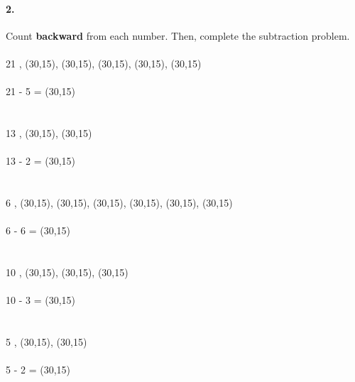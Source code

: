 \documentclass[12pt]{article}
\begin{document}
\paragraph{2.}
Count \textbf{backward} from each number. Then, complete the subtraction problem. \\
\\
21 , \framebox(30,15){}, \framebox(30,15){}, \framebox(30,15){}, \framebox(30,15){}, \framebox(30,15){}
\\
\\
21 - 5 = \framebox(30,15){}
\\
\\
\\
13 , \framebox(30,15){}, \framebox(30,15){}
\\
\\
13 - 2 = \framebox(30,15){}
\\
\\
\\
6 , \framebox(30,15){}, \framebox(30,15){}, \framebox(30,15){}, \framebox(30,15){}, \framebox(30,15){}, \framebox(30,15){}
\\
\\
6 - 6 = \framebox(30,15){}
\\
\\
\\
10 , \framebox(30,15){}, \framebox(30,15){}, \framebox(30,15){}
\\
\\
10 - 3 = \framebox(30,15){}
\\
\\
\\
5 , \framebox(30,15){}, \framebox(30,15){}
\\
\\
5 - 2 = \framebox(30,15){}

\newpage
\end{document}
